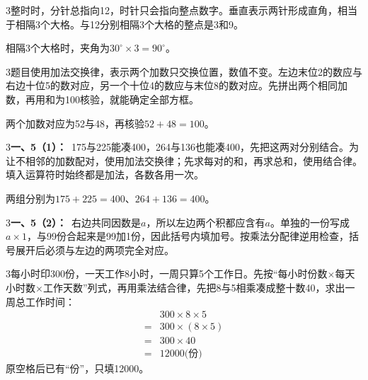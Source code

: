 \documentclass[multi=snippet,border={5bp 20bp 5bp 5bp}]{standalone}
\newenvironment{snippet}[3]{\begin{minipage}{#1bp}\color{answerred}\fontsize{#2}{#3}\selectfont\raggedright}{\end{minipage}}
\begin{document}
\begin{snippet}{505}{11.5}{14}\begin{multicols}{3}\raggedcolumns 整时时，分针总指向12，时针只会指向整点数字。垂直表示两针形成直角，相当于相隔3个大格。与12分别相隔3个大格的整点是3和9。\par 相隔3个大格时，夹角为\(30^\circ\times3=90^\circ\)\allowbreak 。\end{multicols}\end{snippet}
\begin{snippet}{505}{11.5}{14}\begin{multicols}{3}\raggedcolumns 题目使用加法交换律，表示两个加数只交换位置，数值不变。左边末位2的数应与右边十位5的数对应，另一个十位4的数应与末位8的数对应。先拼出两个相同加数，再用和为100核验，就能确定全部方框。\par 两个加数对应为52与48，再核验\(52+48=100\)\allowbreak 。\end{multicols}\end{snippet}
\begin{snippet}{505}{11.5}{14}\begin{multicols}{3}\raggedcolumns \textbf{一、5（1）：}\ 175与225能凑400，264与136也能凑400，先把这两对分别结合。为让不相邻的加数配对，使用加法交换律；先求每对的和，再求总和，使用结合律。填入运算符时始终都是加法，各数各用一次。\par 两组分别为\(175+225=400\)\allowbreak 、\(264+136=400\)\allowbreak 。\end{multicols}\end{snippet}
\begin{snippet}{505}{11.5}{14}\begin{multicols}{3}\raggedcolumns \textbf{一、5（2）：}\ 右边共同因数是\(a\)\allowbreak ，所以左边两个积都应含有\(a\)\allowbreak 。单独的一份写成\(a\times1\)\allowbreak ，与99份合起来是99加1份，因此括号内填加号。按乘法分配律逆用检查，括号展开后必须与左边的两项完全对应。\end{multicols}\end{snippet}
\begin{snippet}{505}{11.5}{14}\begin{multicols}{3}\raggedcolumns 每小时印300份，一天工作8小时，一周只算5个工作日。先按“每小时份数\(\times\)\allowbreak 每天小时数\(\times\)\allowbreak 工作天数”列式，再用乘法结合律，先把8与5相乘凑成整十数40，求出一周总工作时间：\[\begin{aligned}&300\times8\times5\\={}&300\times(8\times5)\\={}&300\times40\\={}&12000\text{(份)}\end{aligned}\]原空格后已有“份”，只填12000。\end{multicols}\end{snippet}
\end{document}
